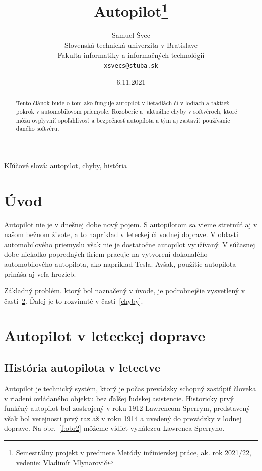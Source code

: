 \documentclass[10pt,twoside,slovak,a4paper]{article}
\title{Autopilot\thanks{Semestrálny projekt v predmete Metódy inžinierskej práce, ak. rok 2021/22, vedenie: Vladimír Mlynarovič}} %
\author{Samuel Švec\\[2pt]
	{\small Slovenská technická univerzita v Bratislave}\\
	{\small Fakulta informatiky a informačných technológií}\\
	{\small \texttt{xsvecs@stuba.sk}}
	}
\date{\small 6.11.2021} %
\begin{document}
\maketitle

\begin{abstract}
Tento článok bude o tom ako funguje autopilot v lietadlách či v lodiach a taktiež pokrok v automobilovom priemysle. Rozoberie aj aktuálne chyby v softvéroch, ktoré môžu ovplyvniť spoľahlivosť a bezpečnosť autopilota a tým aj zastaviť používanie daného softvéru.
\end{abstract}

Kľúčové slová: autopilot, chyby, história

\section{Úvod}

Autopilot nie je v dnešnej dobe nový pojem. S autopilotom sa vieme stretnúť aj v našom bežnom živote, a to napríklad v leteckej či vodnej doprave. V oblasti automobilového priemyslu však nie je dostatočne autopilot využívaný. V súčasnej dobe niekoľko popredných firiem pracuje na vytvorení dokonalého automobilového autopilota, ako napríklad Tesla. Avšak, použitie autopilota prináša aj veľa hrozieb. 

Základný problém, ktorý bol naznačený v úvode, je podrobnejšie vysvetlený v časti~\ref{AFA}.
Ďalej je to rozvinuté v časti~\ref{chyby}.


\section{Autopilot v leteckej doprave} \label{AFA}

\subsection{História autopilota v letectve} 

Autopilot je technický systém, ktorý je počas prevádzky schopný zastúpiť človeka v riadení ovládaného objektu bez ďalšej ľudskej asistencie. Historicky prvý funkčný autopilot bol zostrojený v roku 1912 Lawrencom Sperrym, predstavený však bol verejnosti prvý raz až v roku 1914 a uvedený do prevádzky v lodnej doprave.\cite{AVA} Na obr.~\ref{f:obr2} môžeme vidieť vynálezcu Lawrenca Sperryho.
\end{document}
